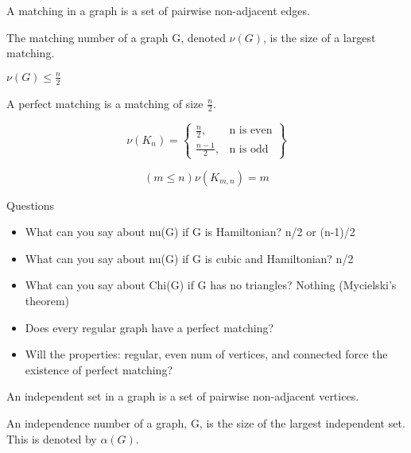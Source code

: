 
\begin{definition}[Matching]
    A matching in a graph is a set of pairwise non-adjacent edges.
\end{definition}

\begin{definition}
    The matching number of a graph G, denoted $\nu(G)$, is the size of a largest matching.
\end{definition}

\begin{proposition}
    $\nu(G) \leq \frac{n}{2}$
\end{proposition}

\begin{definition}
    A perfect matching is a matching of size $\frac{n}{2}$.
\end{definition}

\[
    \nu(K_n) = \left\{\begin{array}{lr}
        \frac{n}{2},    &   \text{n is even}\\
        \frac{n-1}{2},  &   \text{n is odd}
    \end{array}\right\}
\]

\[
    (m \leq n) \nu(K_{m,n}) = m
\]

Questions
\begin{itemize}
    \item What can you say about nu(G) if G is Hamiltonian? n/2 or (n-1)/2
   
    \item What can you say about nu(G) if G is cubic and Hamiltonian? n/2
    \item What can you say about Chi(G) if G has no triangles? Nothing (Mycielski's theorem)
    \item Does every regular graph have a perfect matching?
    \item Will the properties: regular, even num of vertices, and connected force the existence of perfect matching?
\end{itemize}

\begin{definition}
    An independent set in a graph is a set of pairwise non-adjacent vertices.
\end{definition}

\begin{definition}
    An independence number of a graph, G, is the size of the largest independent set. This is denoted by $\alpha(G)$. 
\end{definition}
